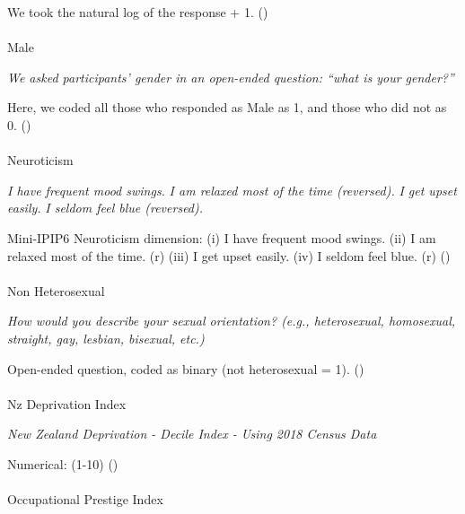 \documentclass[
  single column]{article}
\makeatletter
\let\oldparagraph\paragraph
\renewcommand{\paragraph}{
    \@ifstar
      \xxxParagraphStar
      \xxxParagraphNoStar
  }
\newcommand{\xxxParagraphStar}[1]{\oldparagraph*{#1}\mbox{}}
\newcommand{\xxxParagraphNoStar}[1]{\oldparagraph{#1}\mbox{}}
\makeatother
\begin{document}
We took the natural log of the response + 1.
()

\paragraph{Male}\label{male}

\emph{We asked participants' gender in an open-ended question: ``what is
your gender?''}

Here, we coded all those who responded as Male as 1, and those who did
not as 0. ()

\paragraph{Neuroticism}\label{neuroticism}

\emph{I have frequent mood swings.} \emph{I am relaxed most of the time
(reversed).} \emph{I get upset easily.} \emph{I seldom feel blue
(reversed).}

Mini-IPIP6 Neuroticism dimension: (i) I have frequent mood swings. (ii)
I am relaxed most of the time. (r) (iii) I get upset easily. (iv) I
seldom feel blue. (r) ()

\paragraph{Non Heterosexual}\label{non-heterosexual}

\emph{How would you describe your sexual orientation? (e.g.,
heterosexual, homosexual, straight, gay, lesbian, bisexual, etc.)}

Open-ended question, coded as binary (not heterosexual = 1).
()

\paragraph{Nz Deprivation Index}\label{nz-deprivation-index}

\emph{New Zealand Deprivation - Decile Index - Using 2018 Census Data}

Numerical: (1-10) ()

\paragraph{Occupational Prestige
Index}\label{occupational-prestige-index}
\end{document}
